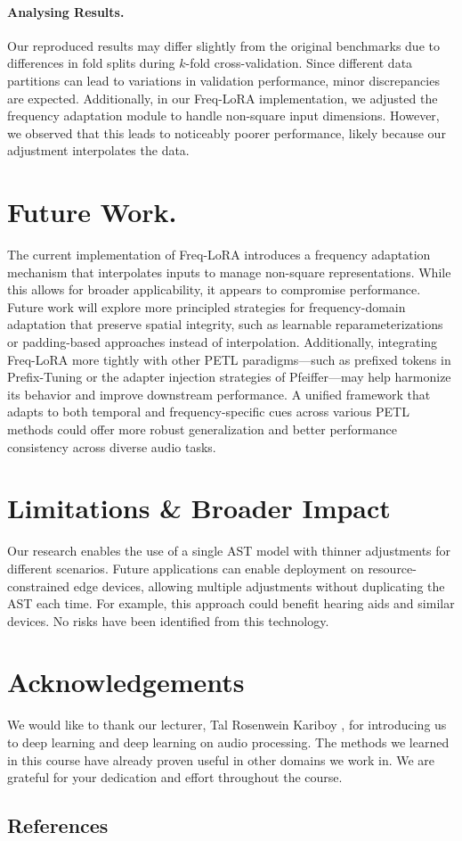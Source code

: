 \documentclass[11pt]{article}
\begin{document}
\paragraph{Analysing Results.} 
Our reproduced results may differ slightly from the original benchmarks due to differences in fold splits during $k$-fold cross-validation. Since different data partitions can lead to variations in validation performance, minor discrepancies are expected. Additionally, in our Freq-LoRA implementation, we adjusted the frequency adaptation module to handle non-square input dimensions. However, we observed that this leads to noticeably poorer performance, likely because our adjustment interpolates the data.

\section{Future Work.}  
The current implementation of Freq-LoRA introduces a frequency adaptation mechanism that interpolates inputs to manage non-square representations. While this allows for broader applicability, it appears to compromise performance. Future work will explore more principled strategies for frequency-domain adaptation that preserve spatial integrity, such as learnable reparameterizations or padding-based approaches instead of interpolation. Additionally, integrating Freq-LoRA more tightly with other PETL paradigms---such as prefixed tokens in Prefix-Tuning or the adapter injection strategies of Pfeiffer---may help harmonize its behavior and improve downstream performance. A unified framework that adapts to both temporal and frequency-specific cues across various PETL methods could offer more robust generalization and better performance consistency across diverse audio tasks.


\section*{Limitations \& Broader Impact}
Our research enables the use of a single AST model with thinner adjustments for different scenarios. Future applications can enable deployment on resource-constrained edge devices, allowing multiple adjustments without duplicating the AST each time. For example, this approach could benefit hearing aids and similar devices.
No risks have been identified from this technology.

\section*{Acknowledgements}

We would like to thank our lecturer, Tal Rosenwein Kariboy
, for introducing us to deep learning and deep learning on audio processing. The methods we learned in this course have already proven useful in other domains we work in. We are grateful for your dedication and effort throughout the course.


\subsection{References}


\end{document}

